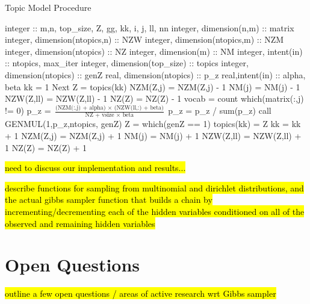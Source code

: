 \documentclass{article}%
\theoremstyle{definition}
\begin{document}
\begin{algorithm}
\caption{Topic Model Procedure}\label{euclid}
\begin{algorithmic}[1]
\State {}
\State integer :: m,n, top\_size, Z, gg, kk, i, j, ll, nn
\State integer, dimension(n,m) :: matrix
\State integer, dimension(ntopics,n) :: NZW
\State integer, dimension(ntopics,m) :: NZM
\State integer, dimension(ntopics) :: NZ
\State integer, dimension(m) :: NM
\State integer, intent(in) :: ntopics, max\_iter
\State integer, dimension(top\_size) :: topics
\State integer, dimension(ntopics) :: genZ
\State real, dimension(ntopics) :: p\_z
\State real,intent(in) :: alpha, beta
\State {}
\State kk = 1
\State  {}
\State   {}
 Next
\EndIf
\State     {}
\State Z = topics(kk)
\State {}
\State NZM(Z,j) = NZM(Z,j) - 1
\State NM(j) = NM(j) - 1
\State NZW(Z,ll) = NZW(Z,ll) - 1
\State NZ(Z) = NZ(Z) - 1
\State
\State vocab = count which(matrix(:,j) != 0)
\State
\State p\_z = $\frac{\text{(NZM(:,j) + alpha) $\times$ (NZW(ll,:) + beta)}}{\text{NZ + vsize $\times$ beta}}$
\State
\State p\_z = p\_z / sum(p\_z)
\State {}
\State call GENMUL(1,p\_z,ntopics, genZ)
\State Z = which(genZ == 1)
\State  topics(kk) = Z
\State kk = kk + 1
\State {}
\State NZM(Z,j) = NZM(Z,j) + 1
\State NM(j) = NM(j) + 1
\State NZW(Z,ll) = NZW(Z,ll) + 1
\State NZ(Z) = NZ(Z) + 1
\State    \EndFor
\State   \EndFor
\State  \EndFor
\State \EndFor
\EndProcedure
\end{algorithmic}
\end{algorithm}

\hl{need to discuss our implementation and results...}

\hl{describe functions for sampling from multinomial and dirichlet distributions, and the actual gibbs sampler function that builds a chain by incrementing/decrementing each of the hidden variables conditioned on all of the observed and remaining hidden variables}

\section{Open Questions}
\hl{outline a few open questions / areas of active research wrt Gibbs sampler}
\end{document}
